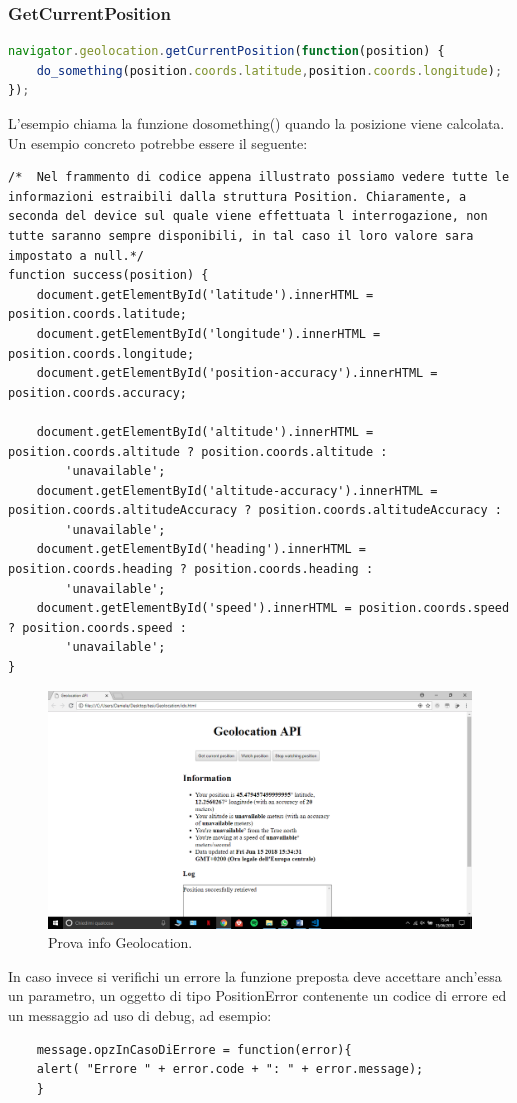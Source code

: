 \documentclass[italian]{article}
\begin{document}
\subsubsection{GetCurrentPosition}
\begin{lstlisting}[language=JavaScript]
navigator.geolocation.getCurrentPosition(function(position) {
	do_something(position.coords.latitude,position.coords.longitude);
});
\end{lstlisting}
L'esempio chiama la funzione dosomething() quando la posizione viene calcolata. Un esempio concreto potrebbe essere il seguente:
\pagebreak
\begin{lstlisting}
/*	Nel frammento di codice appena illustrato possiamo vedere tutte le informazioni estraibili dalla struttura Position. Chiaramente, a seconda del device sul quale viene effettuata l interrogazione, non tutte saranno sempre disponibili, in tal caso il loro valore sara impostato a null.*/
function success(position) {
	document.getElementById('latitude').innerHTML = position.coords.latitude;
	document.getElementById('longitude').innerHTML = position.coords.longitude;
	document.getElementById('position-accuracy').innerHTML = position.coords.accuracy;
	
	document.getElementById('altitude').innerHTML = position.coords.altitude ? position.coords.altitude :
		'unavailable';
	document.getElementById('altitude-accuracy').innerHTML = position.coords.altitudeAccuracy ? position.coords.altitudeAccuracy :
		'unavailable';
	document.getElementById('heading').innerHTML = position.coords.heading ? position.coords.heading :
		'unavailable';
	document.getElementById('speed').innerHTML = position.coords.speed ? position.coords.speed :
		'unavailable';
}
\end{lstlisting}
\begin{figure}[h]
	\centering
	\includegraphics[width=1\linewidth]{img}
	\caption{Prova info Geolocation.}
	\label{fig:Info Geolocation}
\end{figure}
In caso invece si verifichi un errore la funzione preposta deve accettare anch’essa un parametro, un oggetto di tipo PositionError  contenente un codice di errore ed un messaggio ad uso di debug, ad esempio:
\begin{lstlisting}
	message.opzInCasoDiErrore = function(error){ 
	alert( "Errore " + error.code + ": " + error.message);
	}
\end{lstlisting}
\end{document}
